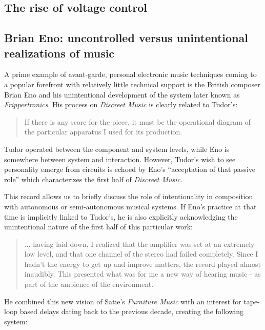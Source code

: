 \subsection{The rise of voltage control}



\subsection{Brian Eno: uncontrolled versus unintentional realizations of music}

A prime example of avant-garde, personal electronic music techniques coming to a popular forefront with relatively little technical support is the British composer Brian Eno and his unintentional development of the system later known as \emph{Frippertronics}. His process on \emph{Discreet Music} is clearly related to Tudor's: 

\begin{quote}
	If there is any score for the piece, it must be the operational diagram of the particular apparatus I used for its production. 
\end{quote}

\cite{eno1975}

Tudor operated between the component and system levels, while Eno is somewhere between system and interaction. However, Tudor's wish to see personality emerge from circuits is echoed by Eno's  ``acceptation of that passive role'' which characterizes the first half of \emph{Discreet Music}. 

This record allows us to briefly discuss the role of intentionality in composition with autonomous or semi-autonomous musical systems. If Eno's practice at that time is implicitly linked to Tudor's, he is also explicitly acknowledging the unintentional nature of the first half of this particular work: 

\begin{quote} ... having laid down, I realized that the amplifier was set at an extremely low level, and that one channel of the stereo had failed completely. Since I hadn't the energy to get up and improve matters, the record played almost inaudibly. This presented what was for me a new way of hearing music - as part of the ambience of the environment.
	
	\cite{eno1975}
	\end{quote}

He combined this new vision of Satie's \emph{Furniture Music} with an interest for tape-loop based delays dating back to the previous decade, creating the following system: 

